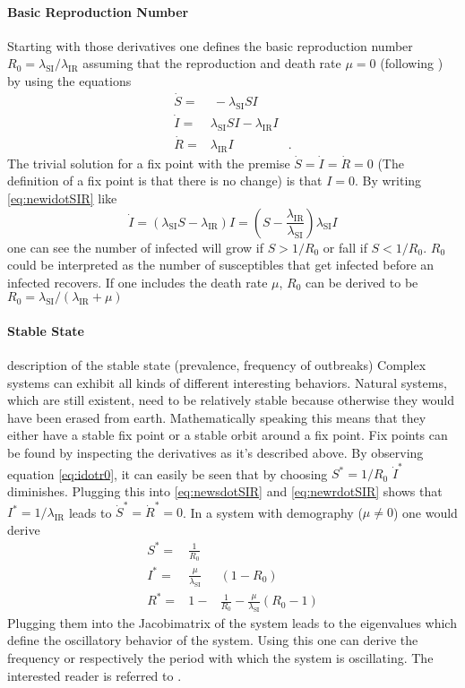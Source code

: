 \paragraph{Basic Reproduction Number}
Starting with those derivatives one defines the basic reproduction number $R_0=\lambda_\text{SI} / \lambda_\text{IR}$ assuming that the reproduction and death rate $\mu=0$ (following \citep{AND92}) by using the equations
\begin{eqnarray}
\dot{S} =& \ -\lambda_\text{SI} SI &  \label{eq:newsdotSIR}\\ 
\dot{I} =& \lambda_\text{SI} SI - \lambda_\text{IR} I  & \label{eq:newidotSIR}\\
\dot{R} =& \lambda_\text{IR} I \label{eq:newrdotSIR}&.
\end{eqnarray}
The trivial solution for a fix point with the premise $\dot{S} = \dot{I} =\dot{R} = 0$ (The definition of a fix point is that there is no change) is that $I=0$. By writing \ref{eq:newidotSIR} like 
\begin{equation}
\dot{I} = (\lambda_\text{SI} S -\lambda_\text{IR}) I = \left( S-\frac{\lambda_\text{IR}}{\lambda_\text{SI}} \right) \lambda_\text{SI} I \label{eq:idotr0}
\end{equation}
one can see the number of infected will grow if $S > 1/R_0$ or fall if $S < 1/R_0$. $R_0$ could be interpreted as the number of susceptibles that get infected before an infected recovers. If one includes the death rate $\mu$, $R_0$ can be derived to be $R_0=\lambda_\text{SI} / (\lambda_\text{IR}+\mu)$
\paragraph{Stable State}
description of the stable state (prevalence, frequency of outbreaks)
Complex systems can exhibit all kinds of different interesting behaviors. Natural systems, which are still existent, need to be relatively stable because otherwise they would have been erased from earth. Mathematically speaking this means that they either have a stable fix point or a stable orbit around a fix point. Fix points can be found by inspecting the derivatives as it's described above. By observing equation \ref{eq:idotr0}, it can easily be seen that by choosing $S^*=1/R_0$ $\dot{I}^*$ diminishes.
Plugging this into \ref{eq:newsdotSIR} and \ref{eq:newrdotSIR} shows that $I^*= 1/\lambda_\text{IR}$ leads to $\dot{S}^*=\dot{R}^* =0$.
In a system with demography ($\mu \neq 0$) one would derive
\begin{eqnarray}
S^* =& \frac{1}{R_0}& \\ 
I^* =& \frac{\mu}{\lambda_\text{SI}}&(1-R_0) \\
R^* =& 1-&\frac{1}{R_0}-\frac{\mu}{\lambda_\text{SI}}(R_0 -1)
\end{eqnarray}
Plugging them into the Jacobimatrix of the system leads to the eigenvalues which define the oscillatory behavior of the system. Using this one can derive the frequency or respectively the period with which the system is oscillating. The interested reader is referred to \citep{matt2008modeling}. 
